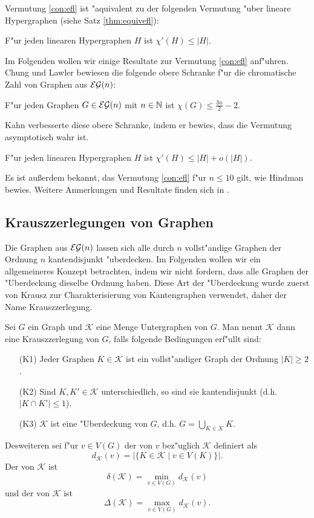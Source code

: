 Vermutung \ref{con:efl} ist "aquivalent zu der folgenden Vermutung "uber lineare Hypergraphen (siehe Satz \ref{thm:equivefl}):
\begin{conjecture}
  F"ur jeden linearen Hypergraphen $H$ ist $\chi'(H) \leq |H|$.
  \label{con:eflhyper}
\end{conjecture}

Im Folgenden wollen wir einige Resultate zur Vermutung \ref{con:efl} anf"uhren. Chung und Lawler \cite{ChungL88} bewiesen die folgende obere Schranke f"ur die chromatische Zahl von Graphen aus ${\cal EG}(n)$:

\begin{theorem}
  F"ur jeden Graphen $G\in{\cal EG}(n)$ mit $n\in{\mathbb{N}}$ ist $\chi(G) \leq \frac{3n}{2}-2$.
  \label{thm:ChungLawler}
\end{theorem}
Kahn \cite{Kahn92} verbesserte diese obere Schranke, indem er bewies, dass die Vermutung asymptotisch wahr ist.
\begin{theorem}
  F"ur jeden linearen Hypergraphen $H$ ist $\chi'(H) \leq |H| + o(|H|)$.
  \label{thm:kahn}
\end{theorem}

Es ist au{\ss}erdem bekannt, das Vermutung \ref{con:efl} f"ur $n\leq 10$ gilt, wie Hindman \cite{Hindman81} bewies.
Weitere Anmerkungen und Resultate finden sich in \cite{RomeroS2007}.

\subsection{Krauszzerlegungen von Graphen}
Die Graphen aus ${\cal EG}(n)$ lassen sich alle durch $n$ vollst"andige Graphen der Ordnung $n$ kantendisjunkt "uberdecken. Im Folgenden wollen wir ein allgemeineres Konzept betrachten, indem wir nicht fordern, dass alle Graphen der "Uberdeckung dieselbe Ordnung haben. 
Diese Art der "Uberdeckung wurde zuerst von Krausz \cite{Krausz43} zur Charakterisierung von Kantengraphen verwendet, daher der Name Krauszzerlegung. 

Sei $G$ ein Graph und $\mathcal{K}$ eine Menge Untergraphen von $G$. Man nennt $\mathcal{K}$ dann eine Krauszzerlegung von $G$, falls folgende Bedingungen erf"ullt sind:
\begin{enumerate}
  \item[\rm{(K1)}] Jeder Graphen $K\in \mathcal{K}$ ist ein vollst"andiger Graph der Ordnung $|K| \geq 2$. 
  \item[\rm{(K2)}] Sind $K,K'\in \mathcal{K}$ unterschiedlich, so sind sie kantendisjunkt (d.h. $|K\cap K'| \leq 1$).
  \item[\rm{(K3)}] $\mathcal K$ ist eine "Uberdeckung von $G$, d.h.  $G=\bigcup\limits_{K\in \mathcal K}K$.
\end{enumerate}
Desweiteren sei f"ur $v\in V(G)$ der  von $v$ bez"uglich $\mathcal K$ definiert als $$d_{\mathcal{K}}(v) = |\{ K\in\mathcal K \;|\;  v \in V(K)\}|.$$ Der  von $\mathcal K$ ist $$\delta(\mathcal K) = \min\limits_{v\in V(G)}d_{\mathcal{K}}(v)$$ und der  von $\mathcal{K}$ ist $$\Delta(\mathcal{K}) = \max\limits_{v\in V(G)}d_{\mathcal{K}}(v).$$

